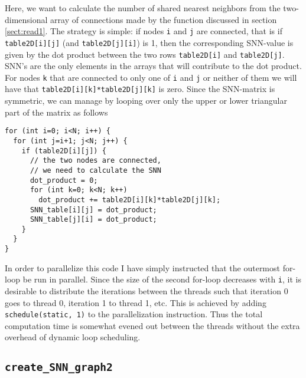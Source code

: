 \documentclass[reprint, english,notitlepage,nofootinbib]{revtex4-1}  %
\begin{document}
Here, we want to calculate the number of shared nearest neighbors from the two-dimensional array of connections made by the function discussed in section \ref{sect:read1}. The strategy is simple: if nodes \verb|i| and \verb|j| are connected, that is if \verb|table2D[i][j]| (and \verb|table2D[j][i]|) is 1, then the corresponding SNN-value is given by the dot product between the two rows \verb|table2D[i]| and \verb|table2D[j]|. SNN's are the only elements in the arrays that will contribute to the dot product. For nodes \verb|k| that are connected to only one of \verb|i| and \verb|j| or neither of them we will have that \verb|table2D[i][k]*table2D[j][k]| is zero. Since the SNN-matrix is symmetric, we can manage by looping over only the upper or lower triangular part of the matrix as follows
\begin{verbatim}
for (int i=0; i<N; i++) {
  for (int j=i+1; j<N; j++) {
    if (table2D[i][j]) {
      // the two nodes are connected,
      // we need to calculate the SNN
      dot_product = 0;
      for (int k=0; k<N; k++)
        dot_product += table2D[i][k]*table2D[j][k];
      SNN_table[i][j] = dot_product;
      SNN_table[j][i] = dot_product;
    }
  }
}
\end{verbatim}

In order to parallelize this code I have simply instructed that the outermost for-loop be run in parallel. Since the size of the second for-loop decreases with \verb|i|, it is desirable to distribute the iterations between the threads such that iteration 0 goes to thread 0, iteration 1 to thread 1, etc. This is achieved by adding \verb|schedule(static, 1)| to the parallelization instruction. Thus the total computation time is somewhat evened out between the threads without the extra overhead of dynamic loop scheduling.


\subsection{\texttt{create\_SNN\_graph2}}
\end{document}
